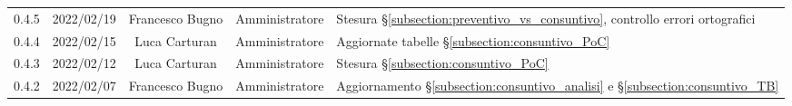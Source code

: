 \begin{center}
\begin{longtable}[c]{c | c | c | c | p{5cm}}
		0.4.5                                                      & 2022/02/19 & Francesco Bugno                        & Amministratore & Stesura §\ref{subsection:preventivo_vs_consuntivo}, controllo errori ortografici                                                               \\
		0.4.4                                                      & 2022/02/15 & Luca Carturan                          & Amministratore & Aggiornate tabelle §\ref{subsection:consuntivo_PoC}                                                                                       \\
		0.4.3                                                      & 2022/02/12 & Luca Carturan                          & Amministratore & Stesura §\ref{subsection:consuntivo_PoC}                                                                                                  \\
		0.4.2                                                      & 2022/02/07 & Francesco Bugno                        & Amministratore & Aggiornamento §\ref{subsection:consuntivo_analisi} e §\ref{subsection:consuntivo_TB}                                                      \\


\end{longtable}
\end{center}
